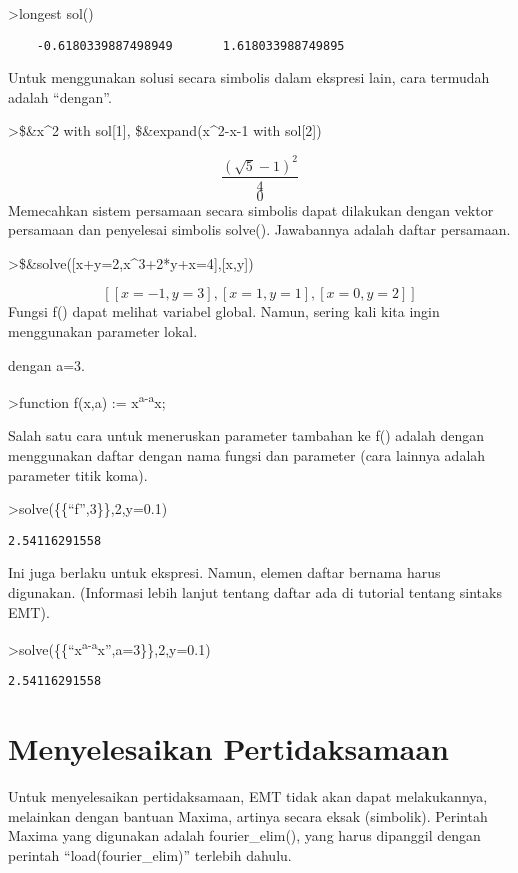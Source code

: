 \documentclass[
]{book}
\begin{document}
\textgreater longest sol()

\begin{verbatim}
    -0.6180339887498949       1.618033988749895 
\end{verbatim}

Untuk menggunakan solusi secara simbolis dalam ekspresi lain, cara termudah adalah ``dengan''.

\textgreater\$\&x\^{}2 with sol{[}1{]}, \$\&expand(x\^{}2-x-1 with sol{[}2{]})

\[\frac{\left(\sqrt{5}-1\right)^2}{4}\] \[0\]Memecahkan sistem persamaan secara simbolis dapat dilakukan dengan vektor persamaan dan penyelesai simbolis solve(). Jawabannya adalah daftar persamaan.

\textgreater\$\&solve({[}x+y=2,x\^{}3+2*y+x=4{]},{[}x,y{]})

\[\left[ \left[ x=-1 , y=3 \right]  , \left[ x=1 , y=1 \right]  , \left[ x=0 , y=2 \right]  \right]\]Fungsi f() dapat melihat variabel global. Namun, sering kali kita ingin menggunakan parameter lokal.

dengan a=3.

\textgreater function f(x,a) := x\textsuperscript{a-a}x;

Salah satu cara untuk meneruskan parameter tambahan ke f() adalah dengan menggunakan daftar dengan nama fungsi dan parameter (cara lainnya adalah parameter titik koma).

\textgreater solve(\{\{``f'',3\}\},2,y=0.1)

\begin{verbatim}
2.54116291558
\end{verbatim}

Ini juga berlaku untuk ekspresi. Namun, elemen daftar bernama harus digunakan. (Informasi lebih lanjut tentang daftar ada di tutorial tentang sintaks EMT).

\textgreater solve(\{\{``x\textsuperscript{a-a}x'',a=3\}\},2,y=0.1)

\begin{verbatim}
2.54116291558
\end{verbatim}

\chapter{Menyelesaikan Pertidaksamaan}\label{menyelesaikan-pertidaksamaan}

Untuk menyelesaikan pertidaksamaan, EMT tidak akan dapat melakukannya, melainkan dengan bantuan Maxima, artinya secara eksak (simbolik). Perintah Maxima yang digunakan adalah fourier\_elim(), yang harus dipanggil dengan perintah ``load(fourier\_elim)'' terlebih dahulu.
\end{document}
